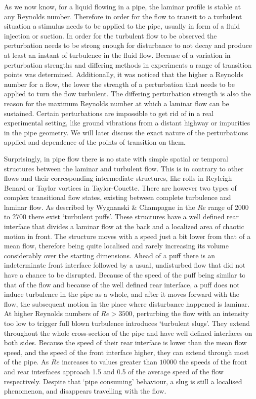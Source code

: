 \documentclass[11pt,a4paper]{article}
\begin{document}
As we now know, for a liquid flowing in a pipe, the laminar profile is stable at any Reynolds number\cite{Eckhardt07}.
Therefore in order for the flow to transit to a turbulent situation a stimulus needs to be applied to the pipe, usually in form of a fluid injection or suction\cite{Darbyshire95}.
In order for the turbulent flow to be observed the perturbation needs to be strong enough for disturbance to not decay and produce at least an instant of turbulence in the fluid flow\cite{Salwen80}\cite{Meseguer03}.
Because of a variation in perturbation strengths and differing methods in experiments a range of transition points was determined.
Additionally, it was noticed that the higher a Reynolds number for a flow, the lower the strength of a perturbation that needs to be applied to turn the flow turbulent\cite{Hof03}.
The differing perturbation strength is also the reason for the maximum Reynolds number at which a laminar flow can be sustained.
Certain perturbations are impossible to get rid of in a real experimental setting, like ground vibrations from a distant highway or impurities in the pipe geometry.
We will later discuss the exact nature of the perturbations applied and dependence of the points of transition on them.

Surprisingly, in pipe flow there is no state with simple spatial or temporal structures between the laminar and turbulent flow\cite{Eckhardt07}.
This is in contrary to other flows and their corresponding intermediate structures, like rolls in Reyleigh-Benard or Taylor vortices in Taylor-Couette.
There are however two types of complex transitional flow states, existing between complete turbulence and laminar flow.
As described by Wygnanski \& Champagne\cite{Wygnanski73} in the \(Re\) range of 2000 to 2700 there exist `turbulent puffs'.
These structures have a well defined rear interface that divides a laminar flow at the back and a localized area of chaotic motion in front.
The structure moves with a speed just a bit lower from that of a mean flow, therefore being quite localised and rarely increasing its volume considerably over the starting dimensions.
Ahead of a puff there is an indeterminate front interface followed by a usual, undisturbed flow that did not have a chance to be disrupted.
Because of the speed of the puff being similar to that of the flow and because of the well defined rear interface, a puff does not induce turbulence in the pipe as a whole, and after it moves forward with the flow, the subsequent motion in the place where disturbance happened is laminar.
At higher Reynolds numbers of \(Re > 3500\), perturbing the flow with an intensity too low to trigger full blown turbulence introduces `turbulent slugs'.
They extend throughout the whole cross-section of the pipe and have well defined interfaces on both sides.
Because the speed of their rear interface is lower than the mean flow speed, and the speed of the front interface higher, they can extend through most of the pipe.
As \(Re\) increases to values greater than \(10000\) the speeds of the front and rear interfaces approach 1.5 and 0.5 of the average speed of the flow respectively.
Despite that `pipe consuming' behaviour, a slug is still a localised phenomenon, and disappears travelling with the flow.
\end{document}
